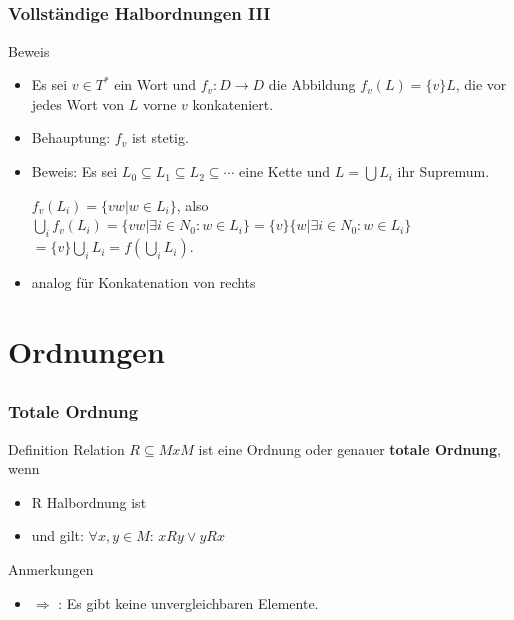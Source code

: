 \subsection*{}
\begin{frame}
  \frametitle{Vollständige Halbordnungen III}
  \begin{block}{Beweis}
    \begin{itemize}
    \item Es sei $v\in T^*$ ein Wort und $f_v:D\rightarrow D$ die Abbildung
      $f_v(L)=\{v\}L$, die vor jedes Wort von $L$ vorne $v$
      konkateniert.
    \item Behauptung: $f_v$ ist stetig.
    \item Beweis: Es sei $L_0\subseteq L_1\subseteq L_2\subseteq
      \cdots$ eine Kette und $L=\bigcup L_i$ ihr Supremum.

      $f_v(L_i)=\{ vw | w\in L_i \}$, also $\bigcup_i f_v(L_i)= \{ vw | \exists i\in N_0: w\in L_i\} = \{v\}\{w | \exists i \in N_0: w\in L_i\}$ $=\{v\}\bigcup_i L_i = f(\bigcup_i L_i)$.
    \item analog für Konkatenation von rechts
    \end{itemize}
	\end{block}
\end{frame}

\section[Ordnungen]{Ordnungen}
\subsection*{}
\begin{frame}
  \frametitle{Totale Ordnung}

	\begin{block}{Definition}
	Relation $R \subseteq M x M$ ist eine Ordnung oder genauer \textbf{totale Ordnung}, wenn
\begin{itemize}
	\item R Halbordnung ist \pause
	\item und gilt: $\forall x ,y \in M$: $x R y \vee y R x$
\end{itemize}
	\end{block}
\pause
	\begin{block}{Anmerkungen}
\begin{itemize}
	\item $\Rightarrow$ : Es gibt keine unvergleichbaren Elemente.
\end{itemize}
	\end{block}
\end{frame}

